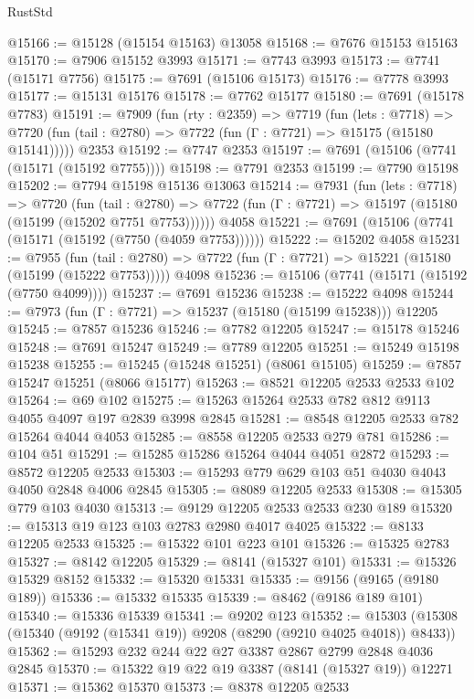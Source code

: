 \begin{lexlean}{RustStd}
\begin{coremodule}
@15166 := @15128 (@15154 @15163) @13058
@15168 := @7676 @15153 @15163
@15170 := @7906 @15152 @3993
@15171 := @7743 @3993
@15173 := @7741 (@15171 @7756)
@15175 := @7691 (@15106 @15173)
@15176 := @7778 @3993
@15177 := @15131 @15176
@15178 := @7762 @15177
@15180 := @7691 (@15178 @7783)
@15191 := @7909
    (fun (rty : @2359) =>
    @7719
      (fun (lets : @7718) =>
      @7720 (fun (tail : @2780) => @7722 (fun (Γ : @7721) => @15175 (@15180 @15141)))))
    @2353
@15192 := @7747 @2353
@15197 := @7691 (@15106 (@7741 (@15171 (@15192 @7755))))
@15198 := @7791 @2353
@15199 := @7790 @15198
@15202 := @7794 @15198 @15136 @13063
@15214 := @7931
    (fun (lets : @7718) =>
    @7720
      (fun (tail : @2780) =>
      @7722 (fun (Γ : @7721) => @15197 (@15180 (@15199 (@15202 @7751 @7753))))))
    @4058
@15221 := @7691 (@15106 (@7741 (@15171 (@15192 (@7750 (@4059 @7753))))))
@15222 := @15202 @4058
@15231 := @7955
    (fun (tail : @2780) => @7722 (fun (Γ : @7721) => @15221 (@15180 (@15199 (@15222 @7753)))))
    @4098
@15236 := @15106 (@7741 (@15171 (@15192 (@7750 @4099))))
@15237 := @7691 @15236
@15238 := @15222 @4098
@15244 := @7973 (fun (Γ : @7721) => @15237 (@15180 (@15199 @15238))) @12205
@15245 := @7857 @15236
@15246 := @7782 @12205
@15247 := @15178 @15246
@15248 := @7691 @15247
@15249 := @7789 @12205
@15251 := @15249 @15198 @15238
@15255 := @15245 (@15248 @15251) (@8061 @15105)
@15259 := @7857 @15247 @15251 (@8066 @15177)
@15263 := @8521 @12205 @2533 @2533 @102
@15264 := @69 @102
@15275 := @15263 @15264 @2533 @782 @812 @9113 @4055 @4097 @197 @2839 @3998 @2845
@15281 := @8548 @12205 @2533 @782 @15264 @4044 @4053
@15285 := @8558 @12205 @2533 @279 @781
@15286 := @104 @51
@15291 := @15285 @15286 @15264 @4044 @4051 @2872
@15293 := @8572 @12205 @2533
@15303 := @15293 @779 @629 @103 @51 @4030 @4043 @4050 @2848 @4006 @2845
@15305 := @8089 @12205 @2533
@15308 := @15305 @779 @103 @4030
@15313 := @9129 @12205 @2533 @2533 @230 @189
@15320 := @15313 @19 @123 @103 @2783 @2980 @4017 @4025
@15322 := @8133 @12205 @2533
@15325 := @15322 @101 @223 @101
@15326 := @15325 @2783
@15327 := @8142 @12205
@15329 := @8141 (@15327 @101)
@15331 := @15326 @15329 @8152
@15332 := @15320 @15331
@15335 := @9156 (@9165 (@9180 @189))
@15336 := @15332 @15335
@15339 := @8462 (@9186 @189 @101)
@15340 := @15336 @15339
@15341 := @9202 @123
@15352 := @15303 (@15308 (@15340 (@9192 (@15341 @19)) @9208 (@8290 (@9210 @4025 @4018)) @8433))
@15362 := @15293 @232 @244 @22 @27 @3387 @2867 @2799 @2848 @4036 @2845
@15370 := @15322 @19 @22 @19 @3387 (@8141 (@15327 @19)) @12271
@15371 := @15362 @15370
@15373 := @8378 @12205 @2533

\end{coremodule}
\end{lexlean}
